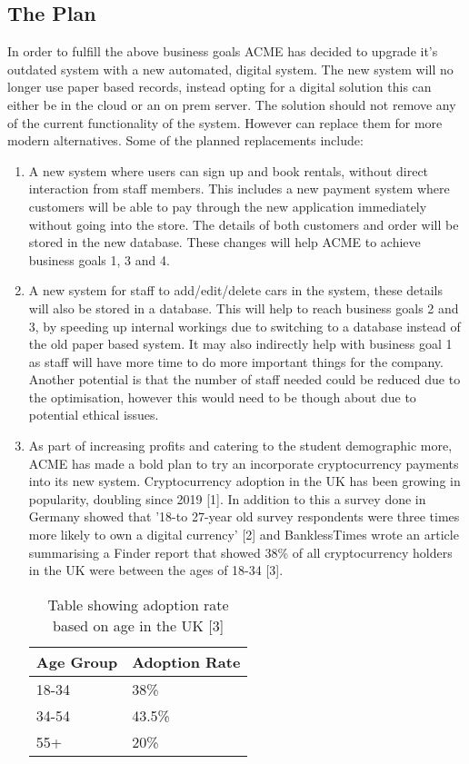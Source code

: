 \subsection{The Plan}
In order to fulfill the above business goals ACME has decided to upgrade it's outdated system with a new automated, digital system. The new system will no 
longer use paper based records, instead opting for a digital solution this can either be in the cloud or an on prem server. The solution should not remove 
any of the current functionality of the system. However can replace them for more modern alternatives. Some of the planned replacements include:
\begin{enumerate}
  \item A new system where users can sign up and book rentals, without direct interaction from staff members. This includes a new payment system where
  customers will be able to pay through the new application immediately without going into the store. The details of both customers and order will be
  stored in the new database. These changes will help ACME to achieve business goals 1, 3 and 4.

  \item A new system for staff to add/edit/delete cars in the system, these details will also be stored in a database. This will help to reach business goals
  2 and 3, by speeding up internal workings due to switching to a database instead of the old paper based system. It may also indirectly help with business goal 1
  as staff will have more time to do more important things for the company. Another potential is that the number of staff needed could be reduced due to the 
  optimisation, however this would need to be though about due to potential ethical issues. 
  
  \item As part of increasing profits and catering to the student demographic more, ACME has made a bold plan to try an incorporate cryptocurrency payments
  into its new system. Cryptocurrency adoption in the UK has been growing in popularity, doubling since 2019 [1]. In addition to this a survey done in Germany 
  showed that '18-to 27-year old survey respondents were three times more likely to own a digital currency' [2] and BanklessTimes wrote an article summarising
  a Finder report that showed 38\% of all cryptocurrency holders in the UK were between the ages of 18-34 [3].

  \begin{table}[H]
    \centering
    \begin{tabular}{|l|l|}
      \hline
      Age Group & Adoption Rate \\ \hline
      18-34     & 38\%          \\ \hline
      34-54     & 43.5\%        \\ \hline
      55+       & 20\%  \\ \hline     
    \end{tabular}
    \caption{Table showing adoption rate based on age in the UK [3]}
  \end{table}
\end{enumerate}

\newpage